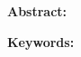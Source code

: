 \vspace*{1cm}
\begin{center}
    \textbf{\huge{Abstract:}}
\end{center}
\vspace{1cm}

\begin{doublespace}
    
    \textbf{Keywords:}
\end{doublespace}